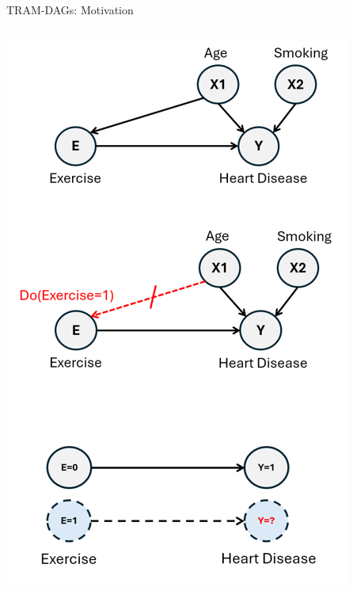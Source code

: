 \documentclass[onlytextwidth,english]{beamer}\usepackage[]{graphicx}\usepackage[]{xcolor}
\begin{document}
\begin{frame}{TRAM-DAGs: Motivation}
\begin{columns}
\begin{column}{0.40\textwidth}
\includegraphics[width=1\linewidth]{img/Pearls_Ladder.png}
\end{column}

\end{columns}

\end{frame}
\end{document}
